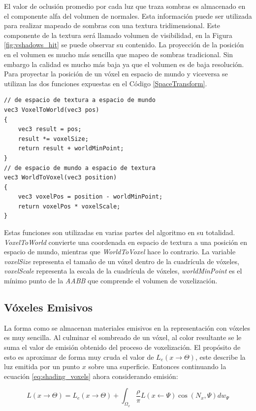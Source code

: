El valor de oclusión promedio por cada luz que traza sombras es almacenado en el componente alfa del volumen de normales. Esta información puede ser utilizada para realizar mapeado de sombras con una textura tridimensional. Este componente de la textura será llamado volumen de visibilidad, en la Figura \ref{fig:vshadows_hit} se puede observar su contenido. La proyección de la posición en el volumen es mucho más sencilla que mapeo de sombras tradicional. Sin embargo la calidad es mucho más baja ya que el volumen es de baja resolución. Para proyectar la posición de un vóxel en espacio de mundo y viceversa se utilizan las dos funciones expuestas en el Código \ref{SpaceTransform}.
\\
\begin{lstlisting}[caption={Transformación de espacio entre coordenadas de textura y posiciones de mundo.}, label=SpaceTransform]
// de espacio de textura a espacio de mundo
vec3 VoxelToWorld(vec3 pos)
{
	vec3 result = pos;
	result *= voxelSize;
	return result + worldMinPoint;
}
// de espacio de mundo a espacio de textura
vec3 WorldToVoxel(vec3 position)
{
    vec3 voxelPos = position - worldMinPoint;
    return voxelPos * voxelScale;
}
\end{lstlisting}

Estas funciones son utilizadas en varias partes del algoritmo en su totalidad. \emph{VoxelToWorld} convierte una coordenada en espacio de textura a una posición en espacio de mundo, mientras que \emph{WorldToVoxel} hace lo contrario. La variable \emph{voxelSize} representa el tamaño de un vóxel dentro de la cuadrícula de vóxeles, \emph{voxelScale} representa la escala de la cuadrícula de vóxeles, \emph{worldMinPoint} es el mínimo punto de la \emph{AABB} que comprende el volumen de voxelización.

\subsection{Vóxeles Emisivos}
La forma como se almacenan materiales emisivos en la representación con vóxeles es muy sencilla. Al culminar el sombreado de un vóxel, al color resultante se le suma el valor de emisión obtenido del proceso de voxelización. El propósito de esto es aproximar de forma muy cruda el valor de $L_e(x\to\Theta)$, este describe la luz emitida por un punto $x$ sobre una superficie. Entonces continuando la ecuación \ref{eq:shading_voxels} ahora considerando emisión:

\begin{equation}
		L(x\to\Theta) = L_e(x\to\Theta) + \int_{\Omega_{x}}{\frac{\rho}{\pi}L(x\gets\Psi)\cos(N_{x}, \Psi)dw_{\Psi}}
\end{equation}

